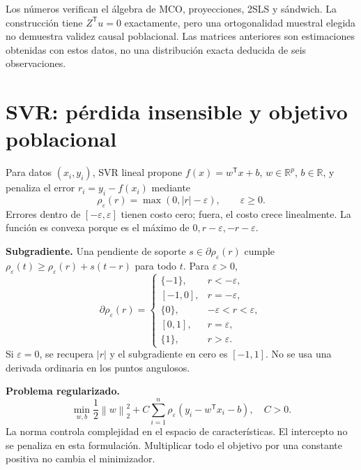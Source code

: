 \documentclass[11pt,a4paper]{article}
\newcommand{\R}{\mathbb R}
\newcommand{\T}{^{\mathsf T}}
\newcommand{\norm}[1]{\left\lVert #1\right\rVert}
\newcommand{\abs}[1]{\left\lvert #1\right\rvert}
\newcommand{\topic}[2]{\clearpage\section{#1}\label{#2}}
\theoremstyle{definition}\newtheorem{definicion}[teorema]{Definición}
\begin{document}
\begin{cuidado}
Los números verifican el álgebra de MCO, proyecciones, 2SLS y sándwich.
La construcción tiene $Z\T u=0$ exactamente, pero una ortogonalidad
muestral elegida no demuestra validez causal poblacional.
Las matrices anteriores son estimaciones obtenidas con estos datos,
no una distribución exacta deducida de seis observaciones.
\end{cuidado}

\topic{SVR: pérdida insensible y objetivo poblacional}{s49}
Para datos $(x_i,y_i)$, SVR lineal propone $f(x)=w\T x+b$,
$w\in\R^p$, $b\in\R$, y penaliza el error
$r_i=y_i-f(x_i)$ mediante
\[
\rho_\varepsilon(r)=\max(0,\abs r-\varepsilon),\qquad \varepsilon\ge0.
\]
Errores dentro de $[-\varepsilon,\varepsilon]$ tienen costo cero;
fuera, el costo crece linealmente.
La función es convexa porque es el máximo de $0,r-\varepsilon,-r-\varepsilon$.

\textbf{Subgradiente.}
Una pendiente de soporte $s\in\partial\rho_\varepsilon(r)$ cumple
$\rho_\varepsilon(t)\ge\rho_\varepsilon(r)+s(t-r)$ para todo $t$.
Para $\varepsilon>0$,
\[
\partial\rho_\varepsilon(r)=
\begin{cases}
\{-1\},&r<-\varepsilon,\\[-2pt]
[-1,0],&r=-\varepsilon,\\
\{0\},&-\varepsilon<r<\varepsilon,\\
[0,1],&r=\varepsilon,\\
\{1\},&r>\varepsilon.
\end{cases}
\]
Si $\varepsilon=0$, se recupera $\abs r$ y el subgradiente en cero es
$[-1,1]$. No se usa una derivada ordinaria en los puntos angulosos.

\textbf{Problema regularizado.}
\[
\boxed{\min_{w,b}\frac12\norm w_2^2+
C\sum_{i=1}^n\rho_\varepsilon(y_i-w\T x_i-b)},\quad C>0.
\]
La norma controla complejidad en el espacio de características.
El intercepto no se penaliza en esta formulación.
Multiplicar todo el objetivo por una constante positiva no cambia
el minimizador.
\end{document}
